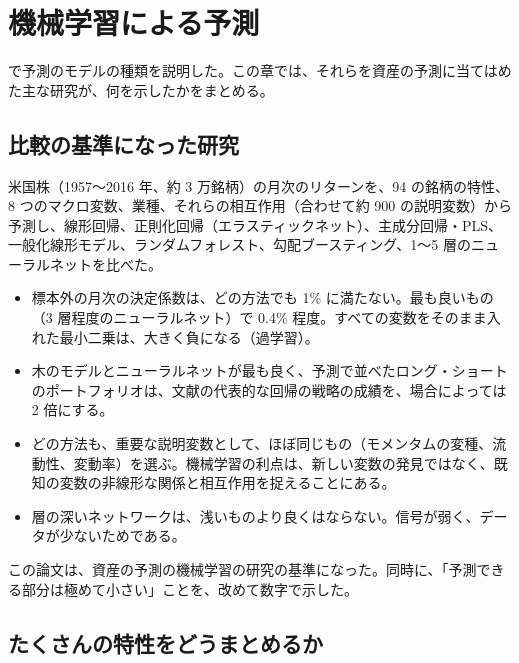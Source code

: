 \chapter{機械学習による予測}
\label{ch:ml}

 で予測のモデルの種類を説明した。この章では、それらを資産の予測に当てはめた主な研究が、何を示したかをまとめる。

\section{比較の基準になった研究}

\begin{paperbox}
米国株（1957〜2016 年、約 3 万銘柄）の月次のリターンを、94 の銘柄の特性、8 つのマクロ変数、業種、それらの相互作用（合わせて約 900 の説明変数）から予測し、線形回帰、正則化回帰（エラスティックネット）、主成分回帰・PLS、一般化線形モデル、ランダムフォレスト、勾配ブースティング、1〜5 層のニューラルネットを比べた。
\begin{itemize}
\item 標本外の月次の決定係数は、どの方法でも 1\% に満たない。最も良いもの（3 層程度のニューラルネット）で 0.4\% 程度。すべての変数をそのまま入れた最小二乗は、大きく負になる（過学習）。
\item 木のモデルとニューラルネットが最も良く、予測で並べたロング・ショートのポートフォリオは、文献の代表的な回帰の戦略の成績を、場合によっては 2 倍にする。
\item どの方法も、重要な説明変数として、ほぼ同じもの（モメンタムの変種、流動性、変動率）を選ぶ。機械学習の利点は、新しい変数の発見ではなく、既知の変数の非線形な関係と相互作用を捉えることにある。
\item 層の深いネットワークは、浅いものより良くはならない。信号が弱く、データが少ないためである。
\end{itemize}
\end{paperbox}

この論文は、資産の予測の機械学習の研究の基準になった。同時に、「予測できる部分は極めて小さい」ことを、改めて数字で示した。

\section{たくさんの特性をどうまとめるか}

